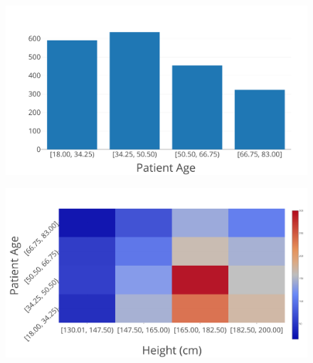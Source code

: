 \begin{figure}[t]
\centering
\begin{minipage}{.5\textwidth}
  \centering
  \includegraphics[width=\columnwidth]{figures/1d-simple-hist.png}
  \label{f:simple-1d-hist}
\end{minipage}%
\begin{minipage}{.5\textwidth}
  \centering
  \includegraphics[width=\columnwidth]{figures/2d-simple-hist.png}
  \label{f:simple-2d-hist}
\end{minipage}
\end{figure}

